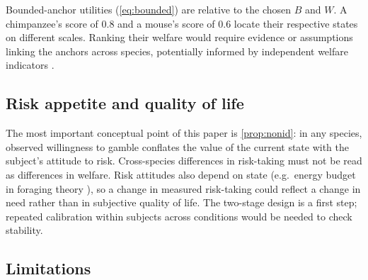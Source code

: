 \documentclass[11pt,a4paper]{article}
\begin{document}
Bounded-anchor utilities (\cref{eq:bounded}) are relative to the chosen $B$ and $W$. A chimpanzee's score of $0.8$ and a mouse's score of $0.6$ locate their respective states on different scales. Ranking their welfare would require evidence or assumptions linking the anchors across species, potentially informed by independent welfare indicators \citep{mendl2010}.

\subsection{Risk appetite and quality of life}

The most important conceptual point of this paper is \cref{prop:nonid}: in any species, observed willingness to gamble conflates the value of the current state with the subject's attitude to risk. Cross-species differences in risk-taking \citep{heilbronner2008,kacelnik1996} must not be read as differences in welfare. Risk attitudes also depend on state (e.g.\ energy budget in foraging theory \citep{stephens1986}), so a change in measured risk-taking could reflect a change in need rather than in subjective quality of life. The two-stage design is a first step; repeated calibration within subjects across conditions would be needed to check stability.

\subsection{Limitations}
\end{document}
